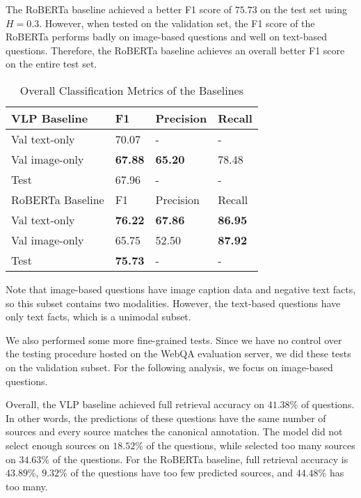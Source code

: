 \documentclass[nohyperref]{article}
\theoremstyle{plain}
\theoremstyle{definition}
\theoremstyle{remark}
\begin{document}
The RoBERTa baseline achieved a better F1 score of $75.73$ on the test set using $H=0.3$.
However, when tested on the validation set, the F1 score of the RoBERTa performs badly on image-based questions and well on text-based questions.
Therefore, the RoBERTa baseline achieves an overall better F1 score on the entire test set.
\begin{table}[h]
    \centering
    \footnotesize
    \begin{tabular}{llll}
        \toprule[1.2pt]
        VLP Baseline & F1 & Precision & Recall \\
        \toprule
        Val text-only  & 70.07 & -     & -     \\
        Val image-only & \textbf{67.88} & \textbf{65.20} & 78.48 \\
        Test           & 67.96 & -     & -      \\
        \midrule[1.2pt]
        RoBERTa Baseline & F1 & Precision & Recall \\
        \midrule
        Val text-only  & \textbf{76.22} & \textbf{67.86} & \textbf{86.95}        \\
        Val image-only & 65.75 & 52.50  & \textbf{87.92}        \\
        Test           & \textbf{75.73} & -    & -      \\
        \bottomrule[1.2pt]
    \end{tabular}
    \caption{Overall Classification Metrics of the Baselines}
    \label{tab:vlp_overall_metrics}
    \vspace{-5pt}
\end{table}

Note that image-based questions have image caption data and negative text facts, so this subset contains two modalities.
However, the text-based questions have only text facts, which is a unimodal subset.

We also performed some more fine-grained tests.
Since we have no control over the testing procedure hosted on the WebQA evaluation server, we did these tests on the validation subset.
For the following analysis, we focus on image-based questions.

Overall, the VLP baseline achieved full retrieval accuracy on $41.38\%$ of questions. In other words, the predictions of these questions have the same number of sources and every source matches the canonical annotation.
The model did not select enough sources on $18.52\%$ of the questions, while selected too many sources on $34.63\%$ of the questions.
For the RoBERTa baseline, full retrieval accuracy is $43.89\%$, $9.32\%$ of the questions have too few predicted sources, and $44.48\%$ has too many.
\end{document}
